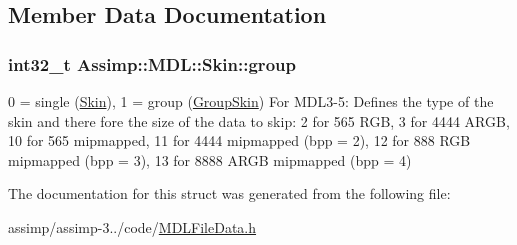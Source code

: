 \subsection{Member Data Documentation}
\hypertarget{struct_assimp_1_1_m_d_l_1_1_skin_a8f6347c6a877b851466abd7d192bb75d}{
\subsubsection[{group}]{\setlength{\rightskip}{0pt plus 5cm}int32\+\_\+t Assimp\+::\+M\+D\+L\+::\+Skin\+::group}}\label{struct_assimp_1_1_m_d_l_1_1_skin_a8f6347c6a877b851466abd7d192bb75d}
0 = single (\hyperlink{struct_assimp_1_1_m_d_l_1_1_skin}{Skin}), 1 = group (\hyperlink{struct_assimp_1_1_m_d_l_1_1_group_skin}{Group\+Skin}) For M\+D\+L3-\/5\+: Defines the type of the skin and there fore the size of the data to skip\+: 2 for 565 R\+G\+B, 3 for 4444 A\+R\+G\+B, 10 for 565 mipmapped, 11 for 4444 mipmapped (bpp = 2), 12 for 888 R\+G\+B mipmapped (bpp = 3), 13 for 8888 A\+R\+G\+B mipmapped (bpp = 4) 

The documentation for this struct was generated from the following file\+:\begin{DoxyCompactItemize}
\item 
assimp/assimp-\/3../code/\hyperlink{_m_d_l_file_data_8h}{M\+D\+L\+File\+Data.\+h}\end{DoxyCompactItemize}
